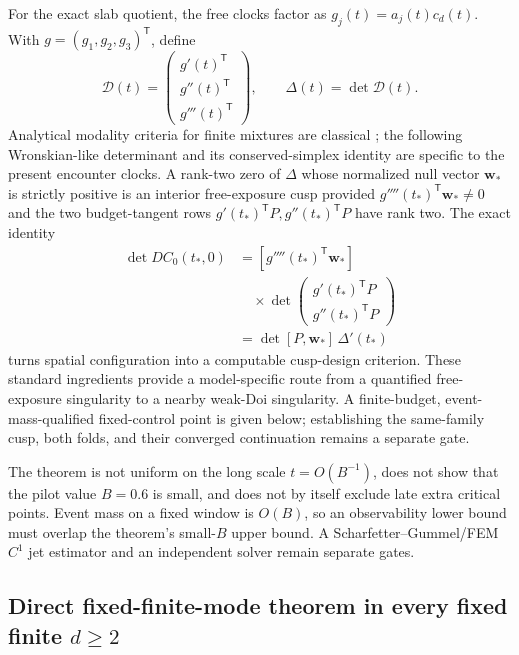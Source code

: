 \documentclass[aps,physrev,reprint,amsmath,amssymb,longbibliography,floatfix]{revtex4-2}
\begin{document}
For the exact slab quotient, the free clocks factor as
$g_j(t)=a_j(t)c_d(t)$.  With $g=(g_1,g_2,g_3)^{\mathsf T}$, define
\begin{equation}
 \mathcal D(t)=
 \begin{pmatrix}g'(t)^{\mathsf T}\\g''(t)^{\mathsf T}\\
 g'''(t)^{\mathsf T}\end{pmatrix},\qquad
 \Delta(t)=\det\mathcal D(t).
\label{eq:freedeterminant}
\end{equation}
Analytical modality criteria for finite mixtures are classical
\cite{rayLindsay2005topography}; the following Wronskian-like determinant and
its conserved-simplex identity are specific to the present encounter clocks.
A rank-two zero of $\Delta$ whose normalized null vector $\bm w_*$ is strictly
positive is an interior free-exposure cusp provided
$g''''(t_*)^{\mathsf T}\bm w_*\ne0$ and the two budget-tangent rows
$g'(t_*)^{\mathsf T}P,g''(t_*)^{\mathsf T}P$ have rank two.  The exact
identity
\begin{align}
 \det DC_0(t_*,0)
 &=[g''''(t_*)^{\mathsf T}\bm w_*]\nonumber\\
 &\quad\times
 \det\!\begin{pmatrix}g'(t_*)^{\mathsf T}P\\g''(t_*)^{\mathsf T}P\end{pmatrix}
 \nonumber\\
 &=\det[P,\bm w_*]\,\Delta'(t_*)
\label{eq:cuspdetidentity}
\end{align}
turns spatial configuration into a computable cusp-design criterion.  These
standard ingredients provide a model-specific route from a quantified
free-exposure singularity to a nearby weak-Doi singularity.  A finite-budget,
event-mass-qualified fixed-control point is given below; establishing the
same-family cusp, both folds, and their converged continuation remains a
separate gate.

The theorem is not uniform on the long scale $t=O(B^{-1})$, does not show that
the pilot value $B=0.6$ is small, and does not by itself exclude late extra
critical points.  Event mass on a fixed window is $O(B)$, so an observability
lower bound must overlap the theorem's small-$B$ upper bound.  A
Scharfetter--Gummel/FEM $C^1$ jet estimator and an independent solver remain
separate gates.

\subsection{Direct fixed-finite-mode theorem in every fixed finite $d\ge2$}
\end{document}
